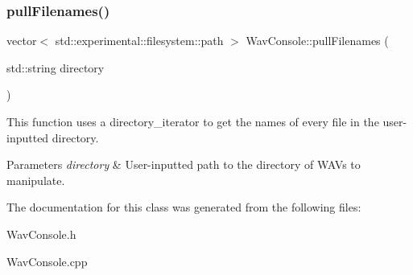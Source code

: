 \subsubsection{\texorpdfstring{pull\+Filenames()}{pullFilenames()}}
{\footnotesize\ttfamily vector$<$ std\+::experimental\+::filesystem\+::path $>$ Wav\+Console\+::pull\+Filenames (\begin{DoxyParamCaption}\item[{std\+::string}]{directory }\end{DoxyParamCaption})}



This function uses a directory\+\_\+iterator to get the names of every file in the user-\/inputted directory. 


\begin{DoxyParams}{Parameters}
{\em directory} & User-\/inputted path to the directory of W\+A\+Vs to manipulate. \\
\hline
\end{DoxyParams}


The documentation for this class was generated from the following files\+:\begin{DoxyCompactItemize}
\item 
Wav\+Console.\+h\item 
Wav\+Console.\+cpp\end{DoxyCompactItemize}
